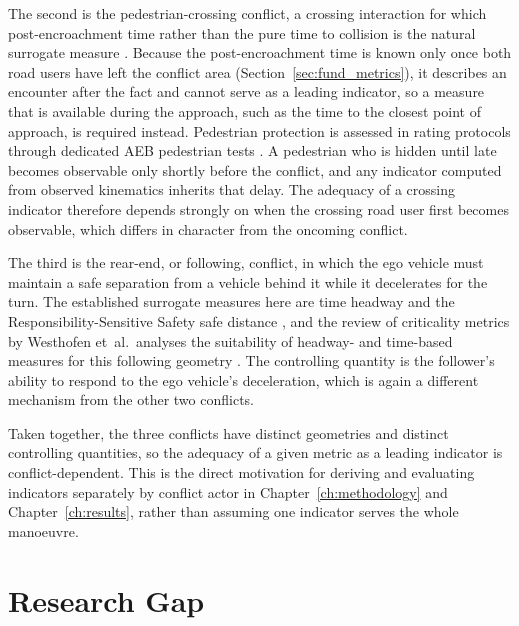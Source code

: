 The second is the pedestrian-crossing conflict, a crossing interaction for which
post-encroachment time rather than the pure time to collision is the natural surrogate
measure \cite{allen1978pet}. Because the post-encroachment time is known only once both
road users have left the conflict area (Section~\ref{sec:fund_metrics}), it describes an
encounter after the fact and cannot serve as a leading indicator, so a measure that is
available during the approach, such as the time to the closest point of approach, is
required instead. Pedestrian protection is assessed in rating protocols through
dedicated \ac{AEB} pedestrian tests \cite{eNCAP_aeb}. A
pedestrian who is hidden until late becomes observable only shortly before the
conflict, and any indicator computed from observed kinematics inherits that delay. The adequacy of a crossing indicator therefore
depends strongly on when the crossing road user first becomes observable, which differs
in character from the oncoming conflict.

The third is the rear-end, or following, conflict, in which the ego vehicle must
maintain a safe separation from a vehicle behind it while it decelerates for the turn.
The established surrogate measures here are time headway and the Responsibility-Sensitive
Safety safe distance \cite{shalev2017rss}, and the review of criticality metrics by Westhofen et~al.\ analyses
the suitability of headway- and time-based measures for this following geometry
\cite{westhofen2023}. The controlling quantity is the follower's ability to respond to
the ego vehicle's deceleration, which is again a different mechanism from the other two
conflicts.

Taken together, the three conflicts have distinct geometries and distinct
controlling quantities, so the adequacy of a given metric as a leading indicator is
conflict-dependent. This is the direct motivation for deriving and evaluating indicators
separately by conflict actor in Chapter~\ref{ch:methodology} and
Chapter~\ref{ch:results}, rather than assuming one indicator serves the whole manoeuvre.

\section{Research Gap}
\label{sec:sota_gap}

